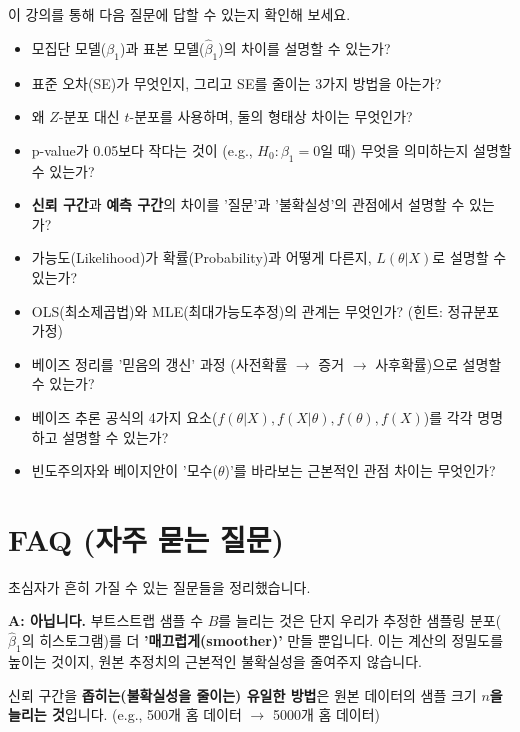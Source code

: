\documentclass[11pt,a4paper]{book}
\theoremstyle{definition}
\begin{document}
이 강의를 통해 다음 질문에 답할 수 있는지 확인해 보세요.

\begin{tcolorbox}[title={최소 학습 목표 (Checklist)}]
    \begin{itemize}
        \item [$\square$] 모집단 모델($\beta_1$)과 표본 모델($\hat{\beta}_1$)의 차이를 설명할 수 있는가?
        \item [$\square$] 표준 오차(SE)가 무엇인지, 그리고 SE를 줄이는 3가지 방법을 아는가?
        \item [$\square$] 왜 $Z$-분포 대신 $t$-분포를 사용하며, 둘의 형태상 차이는 무엇인가?
        \item [$\square$] p-value가 0.05보다 작다는 것이 (e.g., $H_0: \beta_1=0$일 때) 무엇을 의미하는지 설명할 수 있는가?
        \item [$\square$] \textbf{신뢰 구간}과 \textbf{예측 구간}의 차이를 '질문'과 '불확실성'의 관점에서 설명할 수 있는가?
        \item [$\square$] 가능도(Likelihood)가 확률(Probability)과 어떻게 다른지, $L(\theta|X)$로 설명할 수 있는가?
        \item [$\square$] OLS(최소제곱법)와 MLE(최대가능도추정)의 관계는 무엇인가? (힌트: 정규분포 가정)
        \item [$\square$] 베이즈 정리를 '믿음의 갱신' 과정 (사전확률 $\rightarrow$ 증거 $\rightarrow$ 사후확률)으로 설명할 수 있는가?
        \item [$\square$] 베이즈 추론 공식의 4가지 요소($f(\theta|X), f(X|\theta), f(\theta), f(X)$)를 각각 명명하고 설명할 수 있는가?
        \item [$\square$] 빈도주의자와 베이지안이 '모수($\theta$)'를 바라보는 근본적인 관점 차이는 무엇인가?
    \end{itemize}
\end{tcolorbox}

\section{FAQ (자주 묻는 질문)}

초심자가 흔히 가질 수 있는 질문들을 정리했습니다.

\begin{warningbox}[title=Q: 부트스트랩 샘플 수($B$)를 1000번에서 100만 번으로 늘리면 신뢰구간이 더 좁아지나요?]
    \textbf{A: 아닙니다.}
    부트스트랩 샘플 수 $B$를 늘리는 것은 단지 우리가 추정한 샘플링 분포($\hat{\beta}_1$의 히스토그램)를 더 \textbf{'매끄럽게(smoother)'} 만들 뿐입니다. 이는 계산의 정밀도를 높이는 것이지, 원본 추정치의 근본적인 불확실성을 줄여주지 않습니다.

    신뢰 구간을 \textbf{좁히는(불확실성을 줄이는) 유일한 방법}은 원본 데이터의 샘플 크기 \textbf{$n$을 늘리는 것}입니다. (e.g., 500개 홈 데이터 $\rightarrow$ 5000개 홈 데이터)
\end{warningbox}
\end{document}

